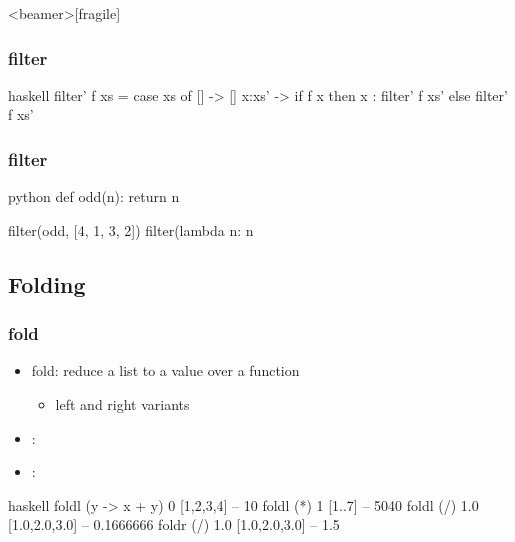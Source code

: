 \documentclass[dvipsnames]{beamer}
\theoremstyle{plain}
\begin{document}
\begin{frame}<beamer>[fragile]
  \frametitle{filter}

  \begin{example}[Haskell]
    \begin{pygments}{haskell}
filter' f xs =
    case xs of
      [] -> []
      x:xs' -> if f x
               then x : filter' f xs'
               else filter' f xs'
    \end{pygments}
  \end{example}
\end{frame}

\begin{frame}[fragile]
  \frametitle{filter}

  \begin{example}[Python]
    \begin{pygments}{python}
def odd(n):
    return n %

filter(odd, [4, 1, 3, 2])
filter(lambda n: n %
    \end{pygments}
  \end{example}
\end{frame}

\subsection{Folding}

\begin{frame}[fragile]
  \frametitle{fold}

  \begin{itemize}
    \item fold: reduce a list to a value over a function
    \begin{itemize}
      \item left and right variants
    \end{itemize}

    \medskip
    \item {}:\\
    \item {}:\\
  \end{itemize}

  \pause
  \begin{example}[Haskell]
    \begin{pygments}{haskell}
foldl (\x y -> x + y) 0 [1,2,3,4]   -- 10
foldl (*) 1 [1..7]                  -- 5040
foldl (/) 1.0 [1.0,2.0,3.0]         -- 0.1666666
foldr (/) 1.0 [1.0,2.0,3.0]         -- 1.5
    \end{pygments}
  \end{example}
\end{frame}
\end{document}
